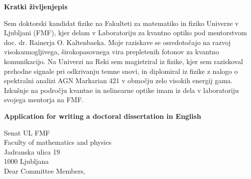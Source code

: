 \documentclass{article}
\begin{document}
\vspace{1cm}

\begin{center} \textbf{Kratki življenjepis} \end{center} Sem doktorski kandidat
fizike na Fakulteti za matematiko in fiziko Univerze v Ljubljani (FMF), kjer
delam v Laboratoriju za kvantno optiko pod mentorstvom doc. dr. Rainerja O.
Kaltenbaeka. Moje raziskave se osredotočajo na razvoj visokozmogljivega,
širokopasovnega vira prepletenih fotonov za kvantno komunikacijo. Na Univerzi
na Reki sem magistriral iz fizike, kjer sem raziskoval prehodne signale pri
odkrivanju temne snovi, in diplomiral iz fizike z nalogo o spektralni analizi
AGN Markarian 421 v območju zelo visokih energij gama. Izkušnje na področju
kvantne in nelinearne optike imam iz dela v laboratoriju svojega mentorja na
FMF.




\clearpage
\pagestyle{plain}
\setcounter{page}{4}
\begin{center}
	\textbf{Application for writing a doctoral dissertation in English}\\
\end{center}

\noindent Senat UL FMF\\
Faculty of mathematics and physics\\
Jadranska ulica 19\\
1000 Ljubljana\\

\vspace{1cm} %
Dear Committee Members,
\vspace{1cm}
\end{document}
